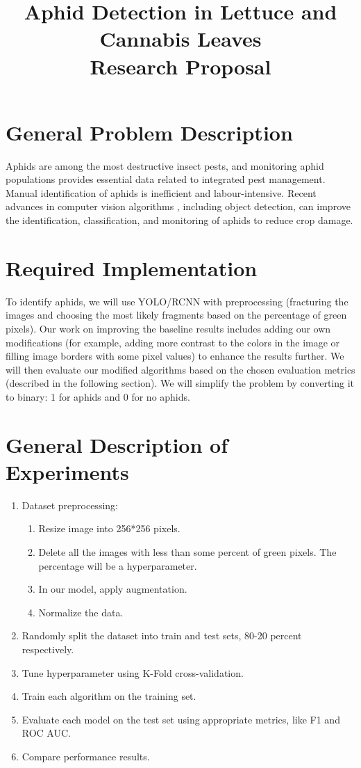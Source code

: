 \documentclass{article}
\title{Aphid Detection in Lettuce and Cannabis Leaves \\ Research Proposal}
\begin{document}
\maketitle

\section*{General Problem Description}
Aphids are among the most destructive insect pests, and monitoring aphid populations 
provides essential data related to integrated pest management. 
Manual identification of aphids is inefficient and labour-intensive. 
Recent advances in computer vision algorithms , including object detection, 
can improve the identification, classification, 
and monitoring of aphids to reduce crop damage.

\section*{Required Implementation}
To identify aphids, we will use YOLO/RCNN with preprocessing
(fracturing the images and choosing the most likely fragments based on the percentage of green pixels).
Our work on improving the baseline results includes adding our own modifications
(for example, adding more contrast to the colors in the image or filling image borders with some pixel values)
to enhance the results further. We will then evaluate our modified algorithms
based on the chosen evaluation metrics (described in the following section).
We will simplify the problem by converting it to binary: 1 for aphids and 0 for no aphids.


\section*{General Description of Experiments}
\begin{enumerate}
  \item Dataset preprocessing:
  \begin{enumerate}
    \item Resize image into 256*256 pixels.
    \item Delete all the images with less than some percent of green pixels. The percentage will be a hyperparameter.
    \item In our model, apply augmentation.
    \item Normalize the data.
  \end{enumerate}
  \item Randomly split the dataset into train and test sets, 80-20 percent respectively.
  \item Tune hyperparameter using K-Fold cross-validation.
  \item Train each algorithm on the training set.
  \item Evaluate each model on the test set using appropriate metrics, like F1 and ROC AUC.
  \item Compare performance results.
\end{enumerate}
\end{document}
